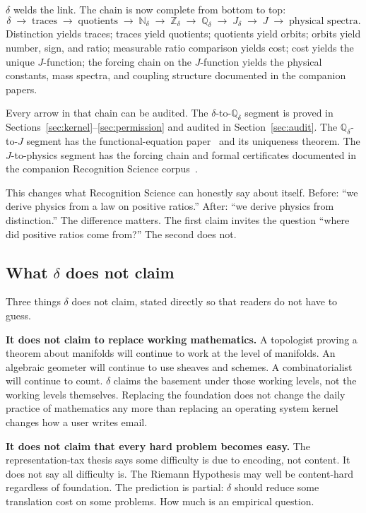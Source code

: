 \documentclass[11pt,a4paper]{article}
\theoremstyle{definition}
\theoremstyle{remark}
\begin{document}
$\delta$ welds the link. The chain is now complete from bottom to top:
\[
  \delta \;\to\; \text{traces} \;\to\; \text{quotients} \;\to\;
  \mathbb{N}_\delta \;\to\; \mathbb{Z}_\delta \;\to\;
  \mathbb{Q}_\delta \;\to\; J_\delta \;\to\; J \;\to\;
  \text{physical spectra}.
\]
Distinction yields traces; traces yield quotients; quotients yield orbits;
orbits yield number, sign, and ratio; measurable ratio comparison yields cost;
cost yields the unique $J$-function; the forcing chain on the $J$-function
yields the physical constants, mass spectra, and coupling structure documented
in the companion papers.

Every arrow in that chain can be audited. The $\delta$-to-$\mathbb{Q}_\delta$
segment is proved in Sections~\ref{sec:kernel}--\ref{sec:permission} and
audited in Section~\ref{sec:audit}. The
$\mathbb{Q}_\delta$-to-$J$ segment has the functional-equation
paper~\cite{Washburn2026LogicFE} and its uniqueness theorem. The
$J$-to-physics segment has the forcing chain and formal certificates
documented in the companion Recognition Science
corpus~\cite{WashburnZlatanovic2026}.

This changes what Recognition Science can honestly say about itself. Before:
``we derive physics from a law on positive ratios.'' After: ``we derive
physics from distinction.'' The difference matters. The first claim invites
the question ``where did positive ratios come from?'' The second does not.

\subsection{What $\delta$ does not claim}

Three things $\delta$ does not claim, stated directly so that readers do not
have to guess.

\textbf{It does not claim to replace working mathematics.} A topologist
proving a theorem about manifolds will continue to work at the level of
manifolds. An algebraic geometer will continue to use sheaves and schemes. A
combinatorialist will continue to count. $\delta$ claims the basement under
those working levels, not the working levels themselves. Replacing the
foundation does not change the daily practice of mathematics any more than
replacing an operating system kernel changes how a user writes email.

\textbf{It does not claim that every hard problem becomes easy.} The
representation-tax thesis says some difficulty is due to encoding, not content.
It does not say all difficulty is. The Riemann Hypothesis may well be
content-hard regardless of foundation. The prediction is partial: $\delta$
should reduce some translation cost on some problems. How much is an empirical
question.
\end{document}
